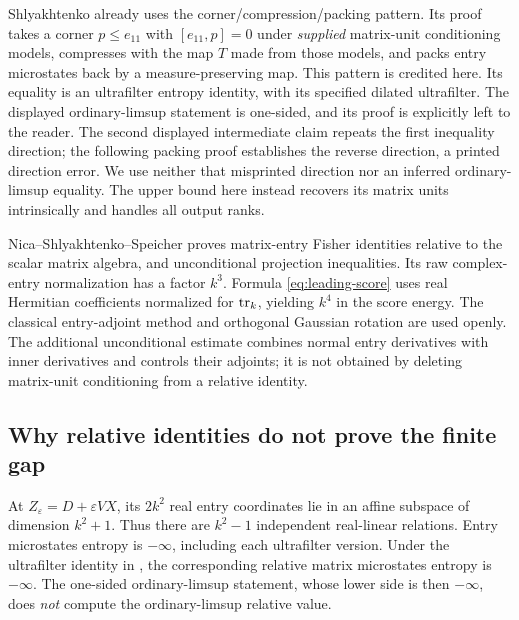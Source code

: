\documentclass[11pt]{article}
\theoremstyle{definition}\newtheorem{definition}[theorem]{Definition}
\theoremstyle{remark}\newtheorem{remark}[theorem]{Remark}
\newcommand{\eps}{\varepsilon}\newcommand{\id}{\mathrm{id}}
\begin{document}
Shlyakhtenko \cite[Section 5, Theorem 5.1]{Shly} already uses the
corner/compression/packing pattern. Its proof takes a corner
$p\leq e_{11}$ with $[e_{11},p]=0$ under \emph{supplied} matrix-unit
conditioning models, compresses with the map $T$ made from those
models, and packs entry microstates back by a measure-preserving map.
This pattern is credited here. Its equality is an ultrafilter entropy
identity, with its specified dilated ultrafilter. The displayed
ordinary-limsup statement is one-sided, and its proof is explicitly
left to the reader. The second displayed intermediate claim repeats
the first inequality direction; the following packing proof establishes
the reverse direction, a printed direction error. We use neither that
misprinted direction nor an inferred ordinary-limsup equality.
The upper bound here instead recovers its matrix units intrinsically
and handles all output ranks.

Nica--Shlyakhtenko--Speicher \cite[Proposition 4.1]{NSSfisher} proves
matrix-entry Fisher identities relative to the scalar matrix algebra,
and unconditional projection inequalities. Its raw complex-entry
normalization has a factor $k^3$. Formula \eqref{eq:leading-score}
uses real Hermitian coefficients normalized for $\operatorname{tr}_k$, yielding
$k^4$ in the score energy. The classical entry-adjoint method and
orthogonal Gaussian rotation are used openly. The additional
unconditional estimate combines normal entry derivatives with inner
derivatives and controls their adjoints; it is not obtained by deleting
matrix-unit conditioning from a relative identity.

\subsection{Why relative identities do not prove the finite gap}
At $Z_\eps=D+\eps VX$, its $2k^2$ real entry coordinates lie in an
affine subspace of dimension $k^2+1$. Thus there are $k^2-1$
independent real-linear relations. Entry microstates entropy is
$-\infty$, including each ultrafilter version. Under the ultrafilter
identity in \cite[Theorem 5.1]{Shly}, the corresponding relative
matrix microstates entropy is $-\infty$. The one-sided
ordinary-limsup statement, whose lower side is then $-\infty$, does
\emph{not} compute the ordinary-limsup relative value.
\end{document}
